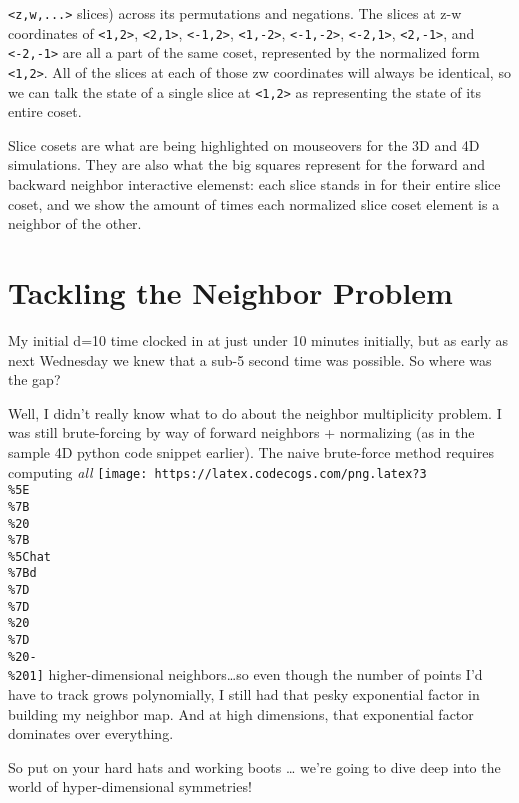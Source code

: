 \documentclass[]{article}
\begin{document}
\begin{itemize}
  \texttt{\textless{}z,w,...\textgreater{}} slices) across its permutations and
  negations. The slices at z-w coordinates of
  \texttt{\textless{}1,2\textgreater{}}, \texttt{\textless{}2,1\textgreater{}},
  \texttt{\textless{}-1,2\textgreater{}},
  \texttt{\textless{}1,-2\textgreater{}},
  \texttt{\textless{}-1,-2\textgreater{}},
  \texttt{\textless{}-2,1\textgreater{}},
  \texttt{\textless{}2,-1\textgreater{}}, and
  \texttt{\textless{}-2,-1\textgreater{}} are all a part of the same coset,
  represented by the normalized form \texttt{\textless{}1,2\textgreater{}}. All
  of the slices at each of those zw coordinates will always be identical, so we
  can talk the state of a single slice at \texttt{\textless{}1,2\textgreater{}}
  as representing the state of its entire coset.

  Slice cosets are what are being highlighted on mouseovers for the 3D and 4D
  simulations. They are also what the big squares represent for the forward and
  backward neighbor interactive elemenst: each slice stands in for their entire
  slice coset, and we show the amount of times each normalized slice coset
  element is a neighbor of the other.
\end{itemize}

\hypertarget{tackling-the-neighbor-problem}{%
\section{Tackling the Neighbor Problem}\label{tackling-the-neighbor-problem}}

My initial d=10 time clocked in at just under 10 minutes initially, but as early
as next Wednesday we knew that a sub-5 second time was possible. So where was
the gap?

Well, I didn't really know what to do about the neighbor multiplicity problem. I
was still brute-forcing by way of forward neighbors + normalizing (as in the
sample 4D python code snippet earlier). The naive brute-force method requires
computing \emph{all}
\texttt{[image: https://latex.codecogs.com/png.latex?3\\\%5E\\\%7B\\\%20\\\%7B\\\%5Chat\\\%7Bd\\\%7D\\\%7D\\\%20\\\%7D\\\%20-\\\%201]}
higher-dimensional neighbors\ldots so even though the number of points I'd have
to track grows polynomially, I still had that pesky exponential factor in
building my neighbor map. And at high dimensions, that exponential factor
dominates over everything.

So put on your hard hats and working boots \ldots{} we're going to dive deep
into the world of hyper-dimensional symmetries!
\end{document}
